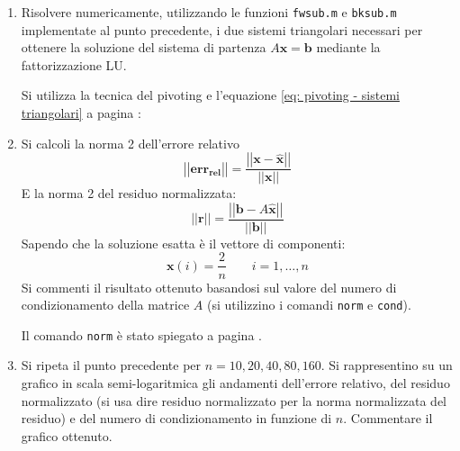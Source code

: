 \begin{enumerate}
    
    \item Risolvere numericamente, utilizzando le funzioni \texttt{fwsub.m} e \texttt{bksub.m} implementate al punto precedente, i due sistemi triangolari necessari per ottenere la soluzione del sistema di partenza $A\mathbf{x} =\mathbf{b}$ mediante la fattorizzazione LU.

    Si utilizza la tecnica del pivoting e l'equazione \ref{eq: pivoting - sistemi triangolari} a pagina \pageref{eq: pivoting - sistemi triangolari}:
    


    \newpage


    \item Si calcoli la norma 2 dell'errore relativo
    \begin{equation*}
        \left|\left| \mathbf{err_{rel}} \right|\right| = \dfrac{
            \left|\left| \mathbf{x} - \widehat{\mathbf{x}} \right|\right|
        }{
            \left|\left| \mathbf{x} \right|\right|
        }
    \end{equation*}
    E la norma 2 del residuo normalizzata:
    \begin{equation*}
        \left|\left| \mathbf{r} \right|\right| = \dfrac{
            \left|\left| \mathbf{b} - A \widehat{\mathbf{x}} \right|\right|
        }{
            \left|\left| \mathbf{b} \right|\right|
        }
    \end{equation*}
    Sapendo che la soluzione esatta è il vettore di componenti:
    \begin{equation*}
        \mathbf{x}\left(i\right) = \dfrac{2}{n} \hspace{2em} i = 1, \dots, n
    \end{equation*}
    Si commenti il risultato ottenuto basandosi sul valore del numero di condizionamento della matrice $A$ (si utilizzino i comandi \texttt{norm} e \texttt{cond}).

    Il comando \texttt{norm} è stato spiegato a pagina \pageref{lab: norm}.
    


    \item Si ripeta il punto precedente per $n = 10,20,40,80,160$. Si rappresentino su un grafico in scala semi-logaritmica gli andamenti dell'errore relativo, del residuo normalizzato (si usa dire residuo normalizzato per la norma normalizzata del residuo) e del numero di condizionamento in funzione di $n$. Commentare il grafico ottenuto.
    


\end{enumerate}
